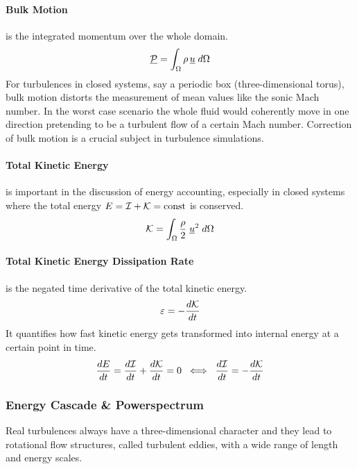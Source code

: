\paragraph{Bulk Motion}
is the integrated momentum over the whole domain.
\begin{equation}
\label{eqn:bulk-motion}
    \underline{\mathcal{P}} = \int_{\Omega} \rho\,\underline{u} \; d\Omega
\end{equation}
For turbulences in closed systems, say a periodic box
(three-dimensional torus), bulk motion distorts the measurement of
mean values like the sonic Mach number. In the worst case scenario the whole
fluid would coherently move in one direction pretending to be a turbulent flow
of a certain Mach number. Correction of bulk motion is a crucial subject
in turbulence simulations.

\paragraph{Total Kinetic Energy}
is important in the discussion of energy accounting, especially in closed
systems where the total energy $E = \mathcal{I} + \mathcal{K} = \text{const}$ is
conserved.
\begin{equation}
\label{eqn:ekin}
    \mathcal{K} = \int_\Omega \frac{\rho}{2} \; \underline{u}^2 \; d\Omega
\end{equation}

\paragraph{Total Kinetic Energy Dissipation Rate}
is the negated time derivative of the total kinetic energy.
\begin{equation}
\label{eqn:ekindisp}
    \varepsilon = -\frac{d\mathcal{K}}{dt} 
\end{equation}
It quantifies how fast kinetic energy gets transformed into internal
energy at a certain point in time. 
\begin{equation}
\label{eqn:ekindisp}
    \frac{dE}{dt} = \frac{d\mathcal{I}}{dt} + \frac{d\mathcal{K}}{dt} = 0 \;\;
        \Longleftrightarrow \;\; \frac{d\mathcal{I}}{dt} = -\frac{d\mathcal{K}}{dt}
\end{equation}

\subsubsection{Energy Cascade \& Powerspectrum}
\label{sec:theory-powerspectra}
Real turbulences always have a three-dimensional character and they lead to
rotational flow structures, called turbulent eddies, with a wide range of
length and energy scales.


